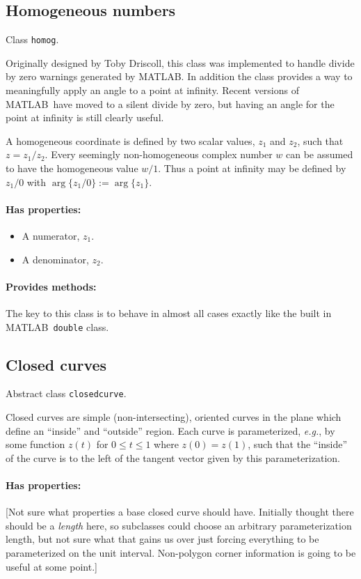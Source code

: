 \documentclass[12pt]{article}
\newcommand{\matlab}{MATLAB}
\begin{document}
\subsection{Homogeneous numbers}
Class \verb+homog+.

Originally designed by Toby Driscoll, this class was implemented to handle divide by zero warnings generated by \matlab. In addition the class provides a way to meaningfully apply an angle to a point at infinity. Recent versions of \matlab\ have moved to a silent divide by zero, but having an angle for the point at infinity is still clearly useful.

A homogeneous coordinate is defined by two scalar values, $z_1$ and $z_2$, such that $z = z_1/z_2$. Every seemingly non-homogeneous complex number $w$ can be assumed to have the homogeneous value $w/1$. Thus a point at infinity may be defined by $z_1/0$ with $\arg\{z_1/0\} := \arg\{z_1\}$.

\paragraph{Has properties:}
\begin{itemize}
  \item A numerator, $z_1$.
  \item A denominator, $z_2$.
\end{itemize}

\paragraph{Provides methods:}
The key to this class is to behave in almost all cases exactly like the built in \matlab\ \verb+double+ class.

\subsection{Closed curves}
Abstract class \verb+closedcurve+.

Closed curves are simple (non-intersecting), oriented curves in the plane which define an ``inside'' and ``outside'' region. Each curve is parameterized, \textit{e.g.}, by some function $z(t)$ for $0\le t\le 1$ where $z(0) = z(1)$, such that the ``inside'' of the curve is to the left of the tangent vector given by this parameterization.

\paragraph{Has properties:} [Not sure what properties a base closed curve should have. Initially thought there should be a \emph{length} here, so subclasses could choose an arbitrary parameterization length, but not sure what that gains us over just forcing everything to be parameterized on the unit interval. Non-polygon corner information is going to be useful at some point.]
\end{document}
